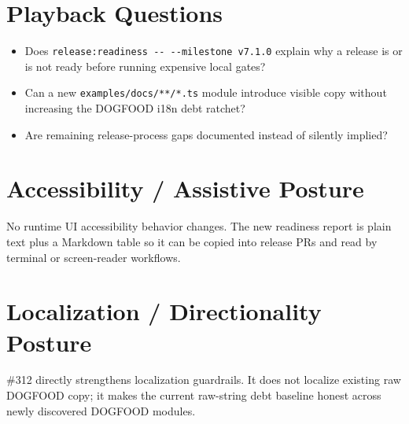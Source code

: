 \section{Playback Questions}\label{record-214-playback-questions}

\begin{itemize}
\tightlist
\item
  Does \texttt{r\allowbreak{}e\allowbreak{}l\allowbreak{}e\allowbreak{}a\allowbreak{}s\allowbreak{}e\allowbreak{}:\allowbreak{}r\allowbreak{}e\allowbreak{}a\allowbreak{}d\allowbreak{}i\allowbreak{}n\allowbreak{}e\allowbreak{}s\allowbreak{}s\allowbreak{} \allowbreak{}-\allowbreak{}-\allowbreak{} \allowbreak{}-\allowbreak{}-\allowbreak{}m\allowbreak{}i\allowbreak{}l\allowbreak{}e\allowbreak{}s\allowbreak{}t\allowbreak{}o\allowbreak{}n\allowbreak{}e\allowbreak{} \allowbreak{}v\allowbreak{}7\allowbreak{}.\allowbreak{}1\allowbreak{}.\allowbreak{}0} explain why a release is or is not ready before running expensive local gates?
\item
  Can a new \texttt{e\allowbreak{}x\allowbreak{}a\allowbreak{}m\allowbreak{}p\allowbreak{}l\allowbreak{}e\allowbreak{}s\allowbreak{}/\allowbreak{}d\allowbreak{}o\allowbreak{}c\allowbreak{}s\allowbreak{}/\allowbreak{}*\allowbreak{}*\allowbreak{}/\allowbreak{}*\allowbreak{}.\allowbreak{}t\allowbreak{}s} module introduce visible copy without increasing the DOGFOOD i18n debt ratchet?
\item
  Are remaining release-process gaps documented instead of silently implied?
\end{itemize}

\section{Accessibility / Assistive Posture}\label{record-214-accessibility-assistive-posture}

No runtime UI accessibility behavior changes. The new readiness report is plain text plus a Markdown table so it can be copied into release PRs and read by terminal or screen-reader workflows.

\section{Localization / Directionality Posture}\label{record-214-localization-directionality-posture}

\#312 directly strengthens localization guardrails. It does not localize existing raw DOGFOOD copy; it makes the current raw-string debt baseline honest across newly discovered DOGFOOD modules.

